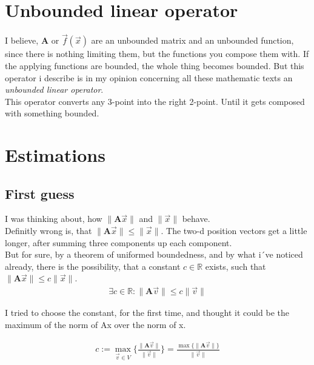 \documentclass[a4paper]{article}
\begin{document}
\begin{Example}
\section{Unbounded linear operator}

I believe, $\boldsymbol{A}$ or $\vec{f}(\vec{x})$ are an unbounded matrix and an unbounded function, since there is nothing limiting them, but the functions you compose them with. If the applying functions are bounded, the whole thing becomes bounded. But this operator i describe is in my opinion concerning all these mathematic texts an \emph{unbounded linear operator}.\\

This operator converts any 3-point into the right 2-point. Until it gets composed with something bounded.\\

\section{Estimations}

\subsection{First guess}

I was thinking about, how $\|\boldsymbol{A}\vec{x}\|$ and $\|\vec{x}\|$ behave.\\

Definitly wrong is, that $\|\boldsymbol{A}\vec{x}\| \leq \|\vec{x}\|$. The two-d position vectors get a little longer, after summing three components up each component.\\ 

But for sure, by a theorem of uniformed boundedness, and by what i´ve noticed already,
there is the possibility, that a constant $c \in \mathbb{R}$ exists, such that $\|\boldsymbol{A}\vec{x}\| \leq c\|\vec{x}\|$.\\

\begin{displaymath}
\begin{align}
\exists c \in \mathbb{R}: \|\boldsymbol{A}\vec{v}\| \leq c\|\vec{v}\|
\end{align}
\end{displaymath}

I tried to choose the constant, for the first time, and thought it could be the maximum of the norm of Ax over the norm of x.

\begin{displaymath}
\begin{align}
c := \max_{\vec{v} \in V}\{ \frac{\|\boldsymbol{A}\vec{v}\|}{\|\vec{v}\|} \} = \frac{\max\{\|\boldsymbol{A}\vec{v}\|\}}{\|\vec{v}\|}
\end{align}
\end{displaymath}


\end{Example}
\end{document}
